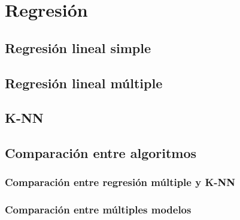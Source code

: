 \section{Regresión}


\subsection{Regresión lineal simple}

\subsection{Regresión lineal múltiple}

\subsection{K-NN}

\subsection{Comparación entre algoritmos}

\subsubsection{Comparación entre regresión múltiple y K-NN}

\subsubsection{Comparación entre múltiples modelos}
